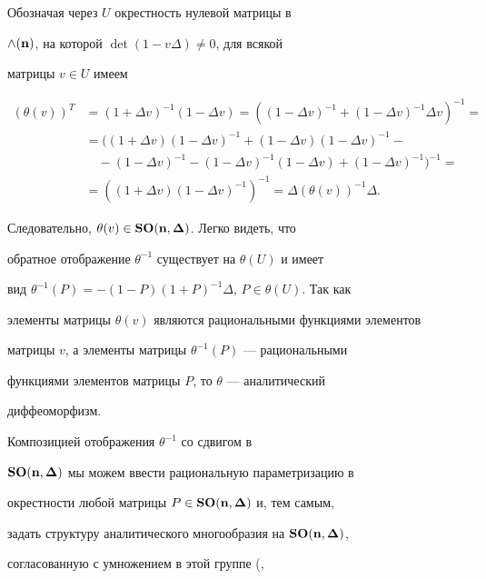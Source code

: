 \begin{pf} Обозначая через $U$ окрестность нулевой матрицы в


${\wedge(\bf n)}$, на которой $\det(1-v\Delta)\ne 0$, для всякой


матрицы $v\in U$ имеем


\begin{align*}


(\theta(v))^T &= (1+\Delta v)^{-1}(1-\Delta v)=((1-\Delta v)^{-1}+


(1-\Delta v)^{-1}\Delta v)^{-1}=\\


&=((1+\Delta v)(1-\Delta v)^{-1}+(1-\Delta v)(1-\Delta v)^{-1}-\\


&\quad -(1-\Delta v)^{-1}-(1-\Delta v)^{-1}(1-\Delta v)+


(1-\Delta v)^{-1})^{-1}=\\


&=((1+\Delta v)(1-\Delta v)^{-1})^{-1}=


\Delta(\theta(v))^{-1}\Delta.


\end{align*}


Следовательно, $\theta(v)\in{\bold{SO(n,\boldsymbol\Delta)}}$. Легко видеть, что


обратное отображение $\theta^{-1}$ существует на $\theta(U)$ и имеет


вид $\theta^{-1}(P)=-(1-P)(1+P)^{-1}\Delta$, $P\in\theta(U)$. Так как


элементы матрицы $\theta(v)$ являются рациональными функциями элементов


матрицы $v$, а элементы матрицы $\theta^{-1}(P)$ --- рациональными


функциями элементов матрицы $P$, то $\theta$ --- аналитический


диффеоморфизм.


\end{pf}





Композицией отображения $\theta^{-1}$ со сдвигом в


$\bold{SO(n,\boldsymbol\Delta)}$ мы можем ввести рациональную параметризацию в


окрестности любой матрицы $P\in{\bold{SO(n,\boldsymbol\Delta)}}$ и, тем самым,


задать структуру аналитического многообразия на $\bold{SO(n,\boldsymbol\Delta)}$,


согласованную с умножением в этой группе (\cite{Post},


